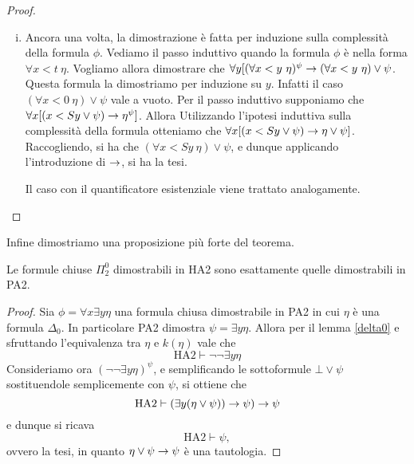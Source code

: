 \documentclass[]{marticle}
\begin{document}
\begin{proof}
\begin{enumerate}[(i)]
            Nel caso in cui la dimostrazione di $\Gamma \vdash
            \phi\sub{\overline{t}} {\overline{x}}$ si concludesse con
            l'eliminazione del quantificatore universale del primo ordine a
            partire dal giudizio $\Gamma \vdash \forall x\phi$, si avrebbe che
            per ipotesi induttiva $\Gamma ^\psi \vdash \forall x \phi^\psi$.
            Dunque $\Gamma ^\psi \vdash
            \phi^\psi\sub{\overline{t}}{\overline{x}}$ e la tesi si ottiene
            applicando il secondo punto.
        \item Ancora una volta, la dimostrazione \`e fatta per induzione sulla
            complessit\`a della formula $\phi$. Vediamo il passo induttivo
            quando la formula $\phi$ \`e nella forma $\forall x<t\ \eta$.
            Vogliamo allora dimostrare che $\forall y [(\forall x<y\ \eta) ^\psi
            \rightarrow (\forall x<y\ \eta) \lor \psi$. Questa formula la dimostriamo
            per induzione su $y$. Infatti il caso $(\forall x<0\ \eta)\lor \psi$
            vale a vuoto. Per il passo induttivo supponiamo che $\forall x
            [(x<Sy \lor \psi) \rightarrow \eta^\psi]$. Allora Utilizzando l'ipotesi
            induttiva sulla complessit\`a della formula otteniamo che $\forall x
            [(x<Sy \lor \psi) \rightarrow \eta \lor \psi]$. Raccogliendo, si ha che
            $(\forall x<Sy\ \eta)\lor \psi$, e dunque applicando l'introduzione
            di $\rightarrow$, si ha la tesi.
            
            Il caso con il quantificatore esistenziale viene trattato
            analogamente.
    \end{enumerate}
\end{proof}

Infine dimostriamo una proposizione pi\`u forte del teorema.

\begin{block}[Proposizione]
    Le formule chiuse $\Pi ^0_2$ dimostrabili in HA2 sono esattamente quelle
    dimostrabili in PA2.
\end{block}
\begin{proof}
    Sia $\phi=\forall x \exists y \eta$ una formula chiusa dimostrabile in PA2
    in cui $\eta$ \`e una formula $\Delta_0$. In particolare PA2 dimostra $\psi
    = \exists y \eta$.  Allora per il lemma \ref{delta0} e sfruttando l'equivalenza
    tra $\eta$ e $k(\eta)$ vale che
    \[
        \text{HA2} \vdash \lnot\lnot \exists y \eta
    \]
    Consideriamo ora $(\lnot\lnot \exists y \eta) ^\psi$, e
    semplificando le sottoformule $\bot\lor\psi$ sostituendole semplicemente con
    $\psi$, si ottiene che 
    \[
        \text{HA2} \vdash (\exists y  (\eta\lor\psi)) \rightarrow \psi) \rightarrow \psi
    \]
    e dunque si ricava 
    \[
        \text{HA2} \vdash \psi,
    \]
    ovvero la tesi, in quanto $\eta\lor\psi\rightarrow \psi$ \`e una tautologia.
\end{proof}
\end{document}
